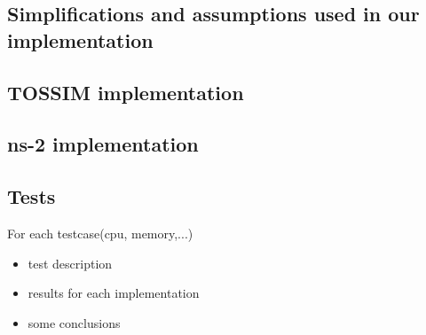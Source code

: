  

\subsection{Simplifications and assumptions used in our implementation}
\subsection{TOSSIM implementation}

\subsection{ns-2 implementation}

\subsection{Tests}
For each testcase(cpu, memory,...)
\begin{itemize}
    \item{test description}
    \item{results for each implementation}
    \item{some conclusions}
\end{itemize}
